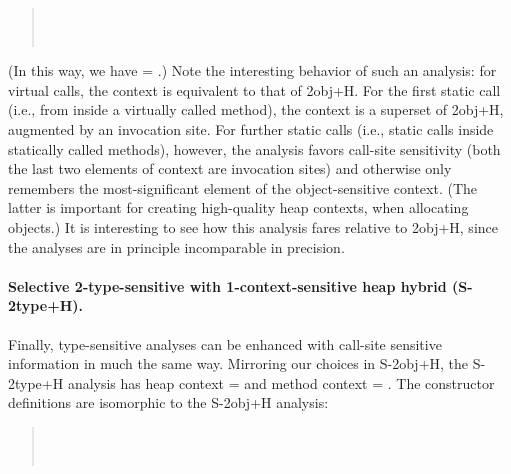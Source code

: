 \begin{quote}
 \\
 \\
\end{quote}

(In this way, we have  = .) Note the interesting behavior of such an analysis: for virtual calls, the context is equivalent to that of 2obj+H. For the first static call (i.e., from inside a virtually called method), the context is a superset of 2obj+H, augmented by an invocation site. For further static calls (i.e., static calls inside statically called methods), however, the analysis favors call-site sensitivity (both the last two elements of context are invocation sites) and otherwise only remembers the most-significant element of the object-sensitive context. (The latter is important for creating high-quality heap contexts, when allocating objects.) It is interesting to see how this analysis fares relative to 2obj+H, since the analyses are in principle incomparable in precision.

\paragraph{Selective 2-type-sensitive with 1-context-sensitive heap hybrid (S-2type+H).}
Finally, type-sensitive analyses can be enhanced with call-site sensitive information in much the same way. Mirroring our choices in S-2obj+H, the S-2type+H analysis has heap context  =  and method context  = . The constructor definitions are isomorphic to the S-2obj+H analysis:

\begin{quote}
 \\
 \\
\end{quote}

